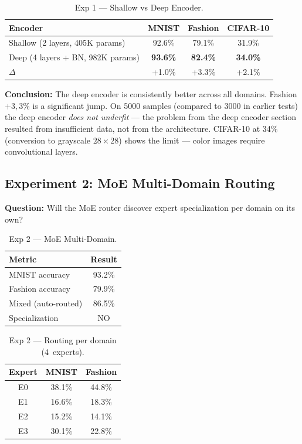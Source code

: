 \documentclass[11pt,a4paper]{report}
\begin{document}
\begin{table}[h!]
\centering
\caption{Exp 1 --- Shallow vs Deep Encoder.}
\begin{tabular}{l c c c}
\hline
\textbf{Encoder} & \textbf{MNIST} & \textbf{Fashion} & \textbf{CIFAR-10} \\
\hline
Shallow (2 layers, 405K params) & 92.6\% & 79.1\% & 31.9\% \\
Deep (4 layers + BN, 982K params) & \textbf{93.6\%} & \textbf{82.4\%} & \textbf{34.0\%} \\
$\Delta$ & +1.0\% & +3.3\% & +2.1\% \\
\hline
\end{tabular}
\label{tab:cpu_exp1}
\end{table}

\textbf{Conclusion:} The deep encoder is consistently better across all domains.
Fashion $+3{,}3\%$ is a significant jump. On 5000 samples (compared to 3000 in earlier tests)
the deep encoder \emph{does not underfit} --- the problem from the deep encoder section resulted
from insufficient data, not from the architecture.
CIFAR-10 at 34\% (conversion to grayscale $28\times 28$) shows the limit ---
color images require convolutional layers.

\subsection{Experiment 2: MoE Multi-Domain Routing}

\textbf{Question:} Will the MoE router discover expert specialization per domain on its own?

\begin{table}[h!]
\centering
\caption{Exp 2 --- MoE Multi-Domain.}
\begin{tabular}{l c}
\hline
\textbf{Metric} & \textbf{Result} \\
\hline
MNIST accuracy & 93.2\% \\
Fashion accuracy & 79.9\% \\
Mixed (auto-routed) & 86.5\% \\
Specialization & NO \\
\hline
\end{tabular}
\label{tab:cpu_exp2}
\end{table}

\begin{table}[h!]
\centering
\caption{Exp 2 --- Routing per domain (4~experts).}
\begin{tabular}{c c c}
\hline
\textbf{Expert} & \textbf{MNIST} & \textbf{Fashion} \\
\hline
E0 & 38.1\% & 44.8\% \\
E1 & 16.6\% & 18.3\% \\
E2 & 15.2\% & 14.1\% \\
E3 & 30.1\% & 22.8\% \\
\hline
\end{tabular}
\label{tab:cpu_exp2_routing}
\end{table}
\end{document}
